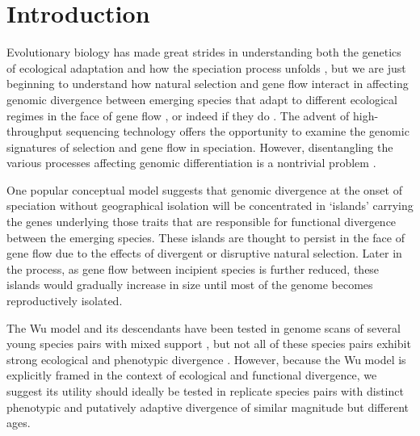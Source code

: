 \section{Introduction}

Evolutionary biology has made great strides in understanding both the genetics of ecological adaptation \cite{hoekstra2006single, schluter2009genetics, arnegard2014genetics} and how the speciation process unfolds \cite{coyne2004speciatjon, gavrilets2004fitness, noor2006speciation, seehausen2014genomics}, but we are just beginning to understand how natural selection and gene flow interact in affecting genomic divergence between emerging species that adapt to different ecological regimes in the face of gene flow \cite{feder2012genomics}, or indeed if they do \cite{bierne2013pervasive}. The advent of high-throughput sequencing technology offers the opportunity to examine the genomic signatures of selection and gene flow in speciation. However, disentangling the various processes affecting genomic differentiation is a nontrivial problem \cite{charlesworth1998measures, noor2009islands, cruickshank2014reanalysis}.

One popular conceptual model \cite{wu2001genic} suggests that genomic divergence at the onset of speciation without geographical isolation will be concentrated in ‘islands’ carrying the genes underlying those traits that are responsible for functional divergence between the emerging species. These islands are thought to persist in the face of gene flow due to the effects of divergent or disruptive natural selection. Later in the process, as gene flow between incipient species is further reduced, these islands would gradually increase in size until most of the genome becomes reproductively isolated.

The Wu \cite{wu2001genic} model and its descendants \cite{wu2004genes, via2008genetic, feder2012genomics} have been tested in genome scans of several young species pairs with mixed support \cite{turner2005genomic, ellegren2012genomic, gagnaire2013genetic, martin2013genomewide, renaut2013genomic, ruegg2014role}, but not all of these species pairs exhibit strong ecological and phenotypic divergence \cite{harr2006genomic, carneiro2010speciation}. However, because the Wu model is explicitly framed in the context of ecological and functional divergence, we suggest its utility should ideally be tested in replicate species pairs with distinct phenotypic and putatively adaptive divergence of similar magnitude but different ages.

